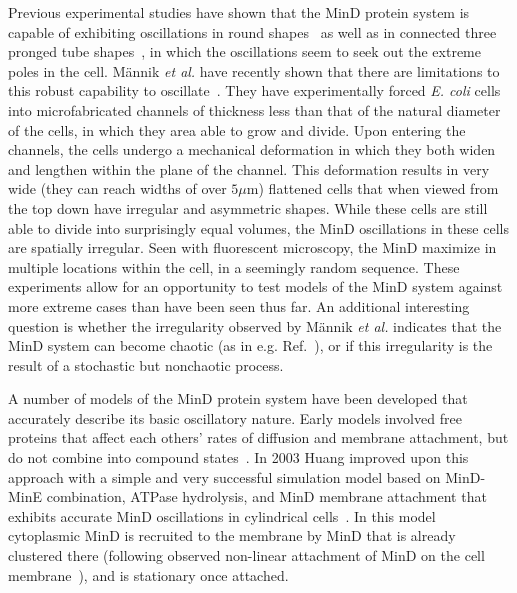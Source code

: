 \documentclass[10pt,letterpaper]{article}
\newcommand\micron{\ensuremath{\mu\text{m}}}
\begin{document}
Previous experimental studies have shown that the MinD protein system
is capable of exhibiting oscillations in round
shapes~\cite{corbin2002exploring,fange2006noise} as well as in
connected three pronged tube shapes~\cite{varma2008min}, in which the
oscillations seem to seek out the extreme poles in the cell.
M\"annik \emph{et al.} have recently shown that there are limitations to
this robust capability to
oscillate~\cite{mannik2012robustness,mannik2009bacterial,mannik2010bacteria}. They
have experimentally forced \emph{E. coli} cells into microfabricated
channels of thickness less than that of the natural diameter of the
cells, in which they area able to grow and divide. Upon entering the
channels, the cells undergo a mechanical deformation in which they
both widen and lengthen within the plane of the channel.  This
deformation results in very wide (they can reach widths of over
$5\micron$) flattened cells that when viewed from the top down have
irregular and asymmetric shapes.  While these cells are still able to
divide into surprisingly equal volumes, the MinD oscillations in these
cells are spatially irregular. Seen with fluorescent microscopy, the
MinD maximize in multiple locations within the cell, in a seemingly
random sequence. These experiments allow for an opportunity to test
models of the MinD system against more extreme cases than have been
seen thus far.  An additional interesting question is whether the
irregularity observed by M\"annik \emph{et al.}  indicates that the MinD
system can become chaotic (as in
e.g. Ref.~), or if this irregularity is
the result of a stochastic but nonchaotic process.
%

A number of models of the MinD protein system have been developed that
accurately describe its basic oscillatory nature.
%
Early models involved free proteins that affect each others' rates of
diffusion and membrane attachment, but do not combine into compound
states~\cite{meinhardt2001pattern}.  In 2003 Huang improved upon this
approach with a simple and very successful simulation model based on
MinD-MinE combination, ATPase hydrolysis, and MinD membrane attachment
that exhibits accurate MinD oscillations in cylindrical
cells~\cite{huang2003dynamic}. In this model cytoplasmic MinD is
recruited to the membrane by MinD that is already clustered there
(following observed non-linear attachment of MinD on the cell
membrane~\cite{hu2002dynamic,shih2002division}), and is stationary
once attached.
%
\end{document}
